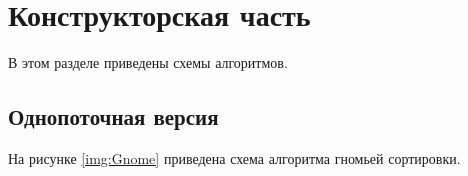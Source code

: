 \chapter{Конструкторская часть}
В этом разделе приведены схемы алгоритмов.

\section{Однопоточная версия}
На рисунке \ref{img:Gnome} приведена схема алгоритма гномьей сортировки.

\clearpage


